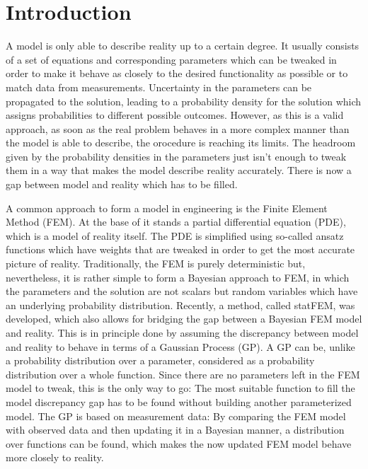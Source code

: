\documentclass[%
  a4paper,oneside,%
  11pt,%
  smallchapters,
  style=printdev,
  extramargin,
  green,%
  rgb, <cmyk>
  ]{tubsbook}
\begin{document}
\tableofcontents


\chapter{Introduction}



A model is only able to describe reality up to a certain degree. It usually consists of a set of equations and corresponding parameters which can be tweaked in order to make it behave as closely to the desired functionality as possible or to match data from measurements. Uncertainty in the parameters can be propagated to the solution, leading to a probability density for the solution which assigns probabilities to different possible outcomes. However, as this is a valid approach, as soon as the real problem behaves in a more complex manner than the model is able to describe, the orocedure is reaching its limits. The headroom given by the probability densities in the parameters just isn't enough to tweak them in a way that makes the model describe reality accurately. There is now a gap between model and reality which has to be filled.

A common approach to form a model in engineering is the Finite Element Method (FEM). At the base of it stands a partial differential equation (PDE), which is a model of reality itself. The PDE is simplified using so-called ansatz functions which have weights that are tweaked in order to get the most accurate picture of reality. Traditionally, the FEM is purely deterministic but, nevertheless, it is rather simple to form a Bayesian approach to FEM, in which the parameters and the solution are not scalars but random variables which have an underlying probability distribution. 
Recently, a method, called statFEM, was developed, which also allows for bridging the gap between a Bayesian FEM model and reality. This is in principle done by assuming the discrepancy between model and reality to behave in terms of a Gaussian Process (GP). A GP can be, unlike a probability distribution over a parameter, considered as a probability distribution over a whole function. Since there are no parameters left in the FEM model to tweak, this is the only way to go: The most suitable function to fill the model discrepancy gap has to be found without building another parameterized model. The GP is based on measurement data: By comparing the FEM model with observed data and then updating it in a Bayesian manner, a distribution over functions can be found, which makes the now updated FEM model behave more closely to reality.
\end{document}
